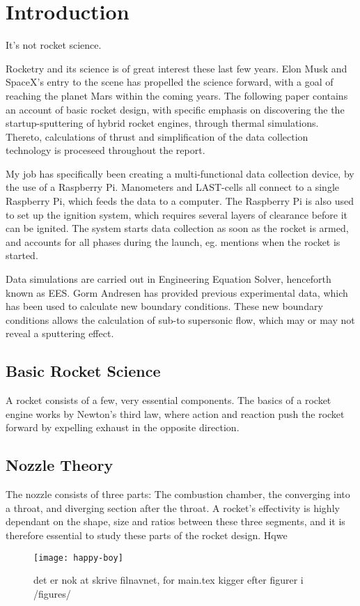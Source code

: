 \chapter{Introduction}

It's not rocket science.

Rocketry and its science is of great interest these last few years. Elon Musk and SpaceX's entry to the scene has propelled the science forward, with a goal of reaching the planet Mars within the coming years. The following paper contains an account of basic rocket design, with specific emphasis on discovering the the startup-sputtering of hybrid rocket engines, through thermal simulations. Thereto, calculations of thrust and simplification of the data collection technology is proceseed throughout the report.

My job has specifically been creating a multi-functional data collection device, by the use of a Raspberry Pi. Manometers and LAST-cells all connect to a single Raspberry Pi, which feeds the data to a computer. The Raspberry Pi is also used to set up the ignition system, which requires several layers of clearance before it can be ignited. The system starts data collection as soon as the rocket is armed, and accounts for all phases during the launch, eg. mentions when the rocket is started.

Data simulations are carried out in Engineering Equation Solver, henceforth known as EES. Gorm Andresen has provided previous experimental data, which has been used to calculate new boundary conditions. These new boundary conditions allows the calculation of sub-to supersonic flow, which may or may not reveal a sputtering effect.

\section{Basic Rocket Science}

A rocket consists of a few, very essential components. The basics of a rocket engine works by Newton's third law, where action and reaction push the rocket forward by expelling exhaust in the opposite direction.

\section{Nozzle Theory}

The nozzle consists of three parts: The combustion chamber, the converging into a throat, and diverging section after the throat. A rocket's effectivity is highly dependant on the shape, size and ratios between these three segments, and it is therefore essential to study these parts of the rocket design.
Hqwe
\begin{figure}
\texttt{[image: happy-boy]}
\caption{det er nok at skrive filnavnet, for main.tex kigger efter figurer i /figures/}
\label{fig:yyy}
\end{figure}
